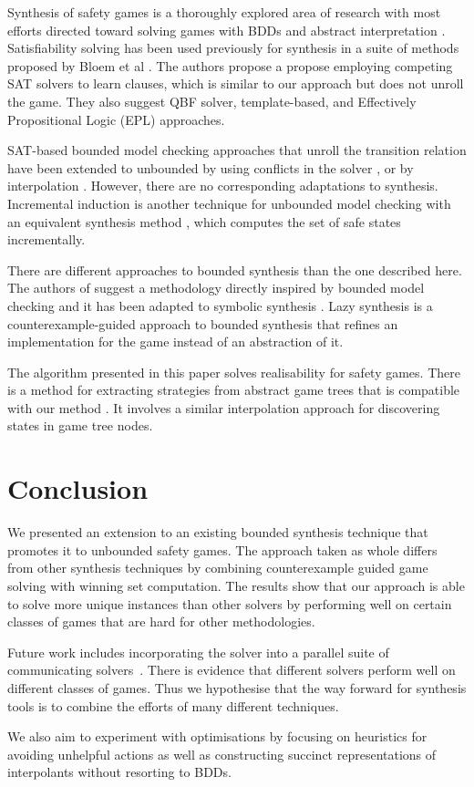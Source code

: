 \documentclass{llncs}
\begin{document}
Synthesis of safety games is a thoroughly explored area of research with most
efforts directed toward solving games with BDDs \cite{burch1990} and abstract
interpretation \cite{walker2014,brenguier2014}. Satisfiability solving has been used
previously for synthesis in a suite of methods proposed by Bloem et al
\cite{bloem2014}. The authors propose a propose employing competing SAT solvers
to learn clauses, which is similar to our approach but does not unroll the
game. They also suggest QBF solver, template-based, and Effectively
Propositional Logic (EPL) approaches.

SAT-based bounded model checking approaches that unroll the transition relation
have been extended to unbounded by using conflicts in the solver
\cite{mcmillan2002}, or by interpolation \cite{mcmillan2003}. However, there
are no corresponding adaptations to synthesis. Incremental induction
\cite{bradley2011} is another technique for unbounded model checking with an
equivalent synthesis method \cite{morgenstern2013}, which computes the set of
safe states incrementally.

There are different approaches to bounded synthesis than the one described
here. The authors of \cite{finkbeiner2013} suggest a methodology directly
inspired by bounded model checking and it has been adapted to symbolic
synthesis \cite{ehlers2010}. Lazy synthesis \cite{finkbeiner2012} is a
counterexample-guided approach to bounded synthesis that refines an
implementation for the game instead of an abstraction of it.

The algorithm presented in this paper solves realisability for safety games.
There is a method for extracting strategies from abstract game trees that is
compatible with our method \cite{een2015}. It involves a similar interpolation
approach for discovering states in game tree nodes.

\section{Conclusion}

We presented an extension to an existing bounded synthesis technique that
promotes it to unbounded safety games. The approach taken as whole differs from
other synthesis techniques by combining counterexample guided game solving with
winning set computation. The results show that our approach is able to solve
more unique instances than other solvers by performing well on certain classes
of games that are hard for other methodologies.

Future work includes incorporating the solver into a parallel suite of
communicating solvers~\cite{bloem2014}. There is evidence that different
solvers perform well on different classes of games. Thus we hypothesise that
the way forward for synthesis tools is to combine the efforts of many different
techniques.

We also aim to experiment with optimisations by focusing on heuristics for
avoiding unhelpful actions as well as constructing succinct representations of
interpolants without resorting to BDDs.



\end{document}
